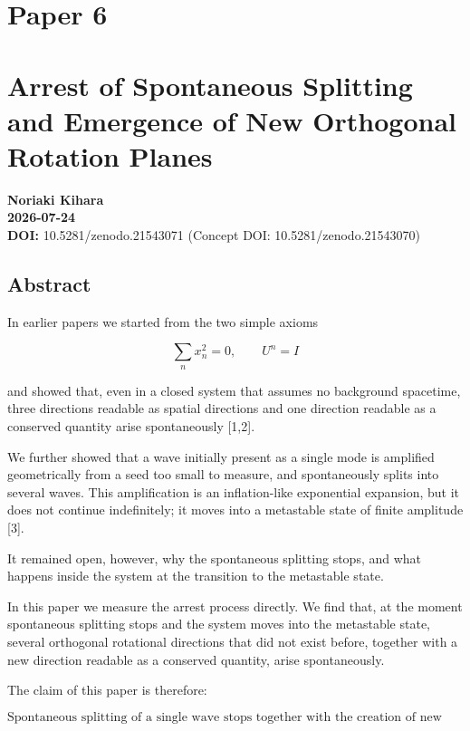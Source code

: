 \documentclass[
  a4paper,
]{article}
\author{}
\date{}
\begin{document}
\section{Paper 6}\label{paper-6}

\section{Arrest of Spontaneous Splitting and Emergence of New Orthogonal
Rotation
Planes}\label{arrest-of-spontaneous-splitting-and-emergence-of-new-orthogonal-rotation-planes}

\textbf{Noriaki Kihara}\\
\textbf{2026-07-24}\\
\textbf{DOI:} 10.5281/zenodo.21543071 (Concept DOI:
10.5281/zenodo.21543070)

\subsection{Abstract}\label{abstract}

In earlier papers we started from the two simple axioms

\[
\sum_n x_n^2=0,
\qquad
U^n=I
\]

and showed that, even in a closed system that assumes no background
spacetime, three directions readable as spatial directions and one
direction readable as a conserved quantity arise spontaneously
{[}1,2{]}.

We further showed that a wave initially present as a single mode is
amplified geometrically from a seed too small to measure, and
spontaneously splits into several waves. This amplification is an
inflation-like exponential expansion, but it does not continue
indefinitely; it moves into a metastable state of finite amplitude
{[}3{]}.

It remained open, however, why the spontaneous splitting stops, and what
happens inside the system at the transition to the metastable state.

In this paper we measure the arrest process directly. We find that, at
the moment spontaneous splitting stops and the system moves into the
metastable state, several orthogonal rotational directions that did not
exist before, together with a new direction readable as a conserved
quantity, arise spontaneously.

The claim of this paper is therefore:

\[
\boxed{
\text{Spontaneous splitting of a single wave stops together with the creation of new orthogonal directions.}
}
\]
\end{document}
